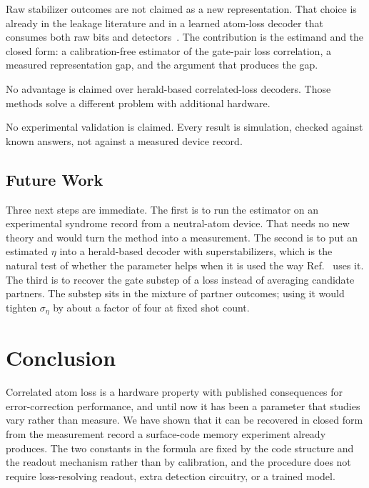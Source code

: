 \documentclass{ieeeaccess}
\begin{document}
Raw stabilizer outcomes are not claimed as a new representation. That choice
is already in the leakage literature
\cite{bultink2020repetitiveparity,varbanov2020leakagedetection} and in a
learned atom-loss decoder that consumes both raw bits and
detectors~\cite{wang2026aiqubitloss}. The contribution is the estimand and
the closed form: a calibration-free estimator of the gate-pair loss
correlation, a measured representation gap, and the argument that produces
the gap.

No advantage is claimed over herald-based correlated-loss decoders. Those
methods solve a different problem with additional hardware.

No experimental validation is claimed. Every result is simulation, checked
against known answers, not against a measured device record.

\subsection{Future Work}
\label{sec:disc-future}

Three next steps are immediate. The first is to run the estimator on an
experimental syndrome record from a neutral-atom device. That needs no new
theory and would turn the method into a measurement. The second is to put an
estimated $\eta$ into a herald-based decoder with superstabilizers, which is
the natural test of whether the parameter helps when it is used the way
Ref.~\cite{perrin2026correlatedloss} uses it. The third is to recover the
gate substep of a loss instead of averaging candidate partners. The substep
sits in the mixture of partner outcomes; using it would tighten $\sigma_\eta$
by about a factor of four at fixed shot count.


\section{Conclusion}
\label{sec:conclusion}

Correlated atom loss is a hardware property with published consequences for
error-correction performance, and until now it has been a parameter that
studies vary rather than measure. We have shown that it can be recovered in
closed form from the measurement record a surface-code memory experiment
already produces. The two constants in the formula are fixed by the code
structure and the readout mechanism rather than by calibration, and the
procedure does not require loss-resolving readout, extra detection circuitry,
or a trained model.
\end{document}
